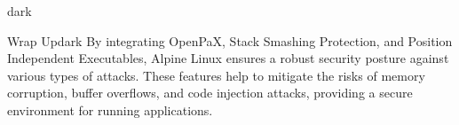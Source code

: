 \begin{baseBoxThree}{}{dark}
    \smallskip
    \begin{baseBoxThree}{Wrap Up}{dark}
        By integrating OpenPaX, Stack Smashing Protection, and Position Independent Executables, Alpine Linux ensures a robust security posture against various types of attacks.
        These features help to mitigate the risks of memory corruption, buffer overflows, and code injection attacks, providing a secure environment for running applications.
    \end{baseBoxThree}
    \smallskip
\end{baseBoxThree}

